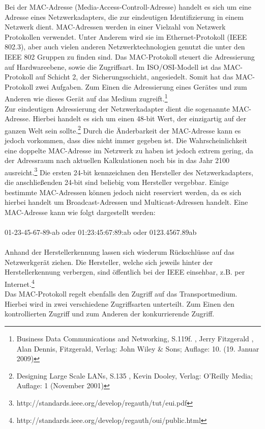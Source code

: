 Bei der MAC-Adresse (Media-Access-Controll-Adresse) handelt es sich um eine Adresse eines Netzwerkadapters, die zur eindeutigen Identifizierung in einem Netzwerk dient.
MAC-Adressen werden in einer Vielzahl von Netzwerk Protokollen verwendet.
Unter Anderem wird sie im Ethernet-Protokoll (IEEE 802.3), aber auch vielen anderen Netzwerktechnologien genutzt die unter den IEEE 802 Gruppen zu finden sind.
Das MAC-Protokoll steuert die Adressierung auf Hardwareebene, sowie die Zugriffsart.
Im ISO/OSI-Modell ist das MAC-Protokoll auf Schicht 2, der Sicherungsschicht, angesiedelt.
Somit hat das MAC-Protokoll zwei Aufgaben.
Zum Einen die Adressierung eines Gerätes und zum Anderen wie dieses Gerät auf das Medium zugreift.\footnote{Business Data Communications and Networking, S.119f. , Jerry Fitzgerald , Alan Dennis, Fitzgerald, Verlag: John Wiley \& Sons; Auflage: 10. (19. Januar 2009)}\\
Zur eindeutigen Adressierung der Netzwerkadapter  dient die sogenannte MAC-Adresse. Hierbei handelt es sich um einen 48-bit Wert, der einzigartig auf der ganzen Welt sein sollte.\footnote{Designing Large Scale LANs, S.135 , Kevin Dooley, Verlag: O'Reilly Media; Auflage: 1 (November 2001)} Durch die Änderbarkeit der MAC-Adresse kann es jedoch vorkommen, dass dies nicht immer gegeben ist. Die Wahrscheinlichkeit eine doppelte MAC-Adresse im Netzwerk zu haben ist jedoch extrem gering, da der Adressraum nach aktuellen Kalkulationen noch bis in das Jahr 2100 ausreicht.\footnote{http://standards.ieee.org/develop/regauth/tut/eui.pdf} Die ersten 24-bit kennzeichnen den Hersteller des Netzwerkadapters, die anschließenden 24-bit sind beliebig vom Hersteller vergebbar.
Einige bestimmte MAC-Adressen können jedoch nicht reserviert werden, da es sich hierbei handelt um Broadcast-Adressen und Multicast-Adressen handelt.
Eine MAC-Adresse kann wie folgt dargestellt werden:\\
\\
01-23-45-67-89-ab oder 01:23:45:67:89:ab oder 0123.4567.89ab\\
\\
Anhand der Herstellerkennung lassen sich wiederum Rückschlüsse auf das Netzwerkgerät ziehen.
Die Hersteller, welche sich jeweils hinter der Herstellerkennung verbergen, sind öffentlich bei der IEEE einsehbar, z.B. per Internet.\footnote{http://standards.ieee.org/develop/regauth/oui/public.html}\\
Das MAC-Protokoll regelt ebenfalls den Zugriff auf das Transportmedium. Hierbei wird in zwei verschiedene Zugriffsarten unterteilt. Zum Einen den kontrollierten Zugriff und zum Anderen der konkurrierende Zugriff.

